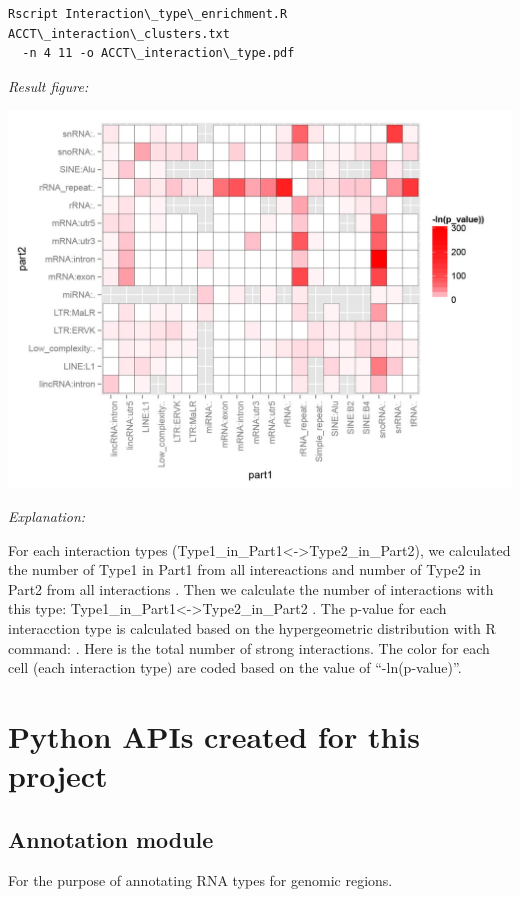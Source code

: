 \documentclass[letterpaper,10pt,english]{sphinxmanual}
\begin{document}
\begin{Verbatim}[commandchars=\\\{\}]
Rscript Interaction\_type\_enrichment.R ACCT\_interaction\_clusters.txt
  -n 4 11 -o ACCT\_interaction\_type.pdf
\end{Verbatim}

\emph{Result figure:}

\includegraphics{ES1_interaction_type.jpg}

\emph{Explanation:}

For each interaction types (Type1\_in\_Part1\textless{}-\textgreater{}Type2\_in\_Part2), we calculated the number of Type1 in Part1 from all intereactions  and number of Type2 in Part2 from all interactions . Then we calculate the number of interactions with this type: Type1\_in\_Part1\textless{}-\textgreater{}Type2\_in\_Part2 . The p-value for each interacction type is calculated based on the hypergeometric distribution with R command: . Here  is the total number of strong interactions. The color for each cell (each interaction type) are coded based on the value of ``-ln(p-value)''.


\chapter{Python APIs created for this project}
\label{Other_api:python-apis-created-for-this-project}\label{Other_api::doc}

\section{Annotation module}
\label{Other_api:annotation-module}\label{Other_api:module-Annotation}
For the purpose of annotating RNA types for genomic regions.
\end{document}
